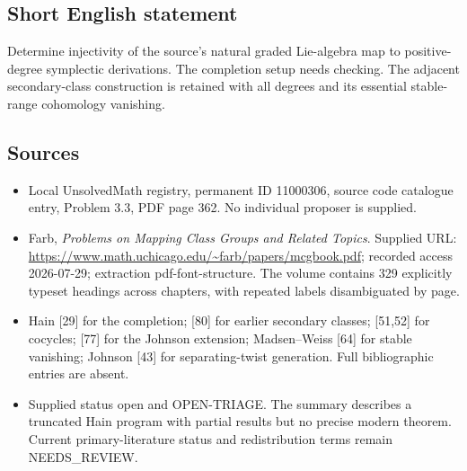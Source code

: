 \documentclass[11pt]{article}
\begin{document}
\subsection{Short English statement}
Determine injectivity of the source's natural graded Lie-algebra map to positive-degree symplectic derivations. The completion setup needs checking. The adjacent secondary-class construction is retained with all degrees and its essential stable-range cohomology vanishing.
\subsection{Sources}
\begin{itemize}
\item Local UnsolvedMath registry, permanent ID 11000306, source code catalogue entry, Problem 3.3, PDF page 362. No individual proposer is supplied.
\item Farb, \emph{Problems on Mapping Class Groups and Related Topics}. Supplied URL: \url{https://www.math.uchicago.edu/~farb/papers/mcgbook.pdf}; recorded access 2026-07-29; extraction pdf-font-structure. The volume contains 329 explicitly typeset headings across chapters, with repeated labels disambiguated by page.
\item Hain [29] for the completion; [80] for earlier secondary classes; [51,52] for cocycles; [77] for the Johnson extension; Madsen--Weiss [64] for stable vanishing; Johnson [43] for separating-twist generation. Full bibliographic entries are absent.
\item Supplied status open and OPEN-TRIAGE. The summary describes a truncated Hain program with partial results but no precise modern theorem. Current primary-literature status and redistribution terms remain NEEDS\_REVIEW.
\end{itemize}
\end{document}

